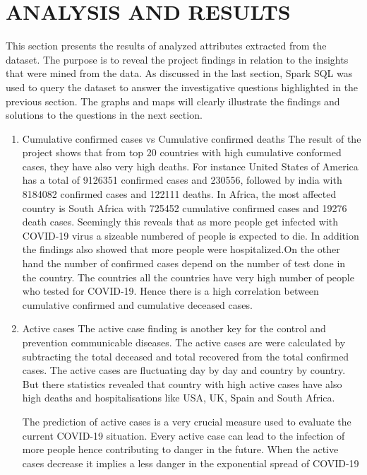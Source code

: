 \documentclass[11pt]{article}
\begin{document}
\section{ANALYSIS AND RESULTS}

This section presents the results of analyzed attributes extracted from the dataset. The purpose is to reveal the project findings  in relation to the insights that were mined from the data. As discussed in the last section, Spark SQL was used to query the dataset to answer the  investigative questions highlighted in the previous section. The graphs and maps will clearly illustrate the findings and solutions to the  questions in the next section.  

\begin{enumerate}
    \item Cumulative confirmed cases vs Cumulative confirmed deaths 
    The result of the project shows that  from top 20 countries with high cumulative conformed cases, they have also very high deaths. For instance United States of America has a total of 9126351 confirmed cases and 230556, followed by india with 8184082 confirmed cases and 122111 deaths. In Africa, the most affected country is South Africa with 725452 cumulative confirmed cases and 19276 death cases. Seemingly this reveals that as more people get infected with COVID-19 virus a sizeable numbered of people is expected to die. In addition the findings also showed that more people were hospitalized.On the other hand the number of confirmed cases depend on the number of test done in the country. The countries all the countries have very high number of people who tested for COVID-19.  Hence there is a high correlation between cumulative confirmed and  cumulative deceased cases. 
    
    \item Active cases
    The active case finding is another key for the control and prevention communicable diseases. The active cases are were calculated by subtracting the total deceased and total recovered from the total confirmed cases. The active cases are fluctuating day by day and country by country.  But  there statistics revealed that country with high active cases have also high deaths and hospitalisations like USA, UK, Spain and South Africa.
    
    The prediction of active cases is a very crucial measure used to evaluate the current COVID-19 situation. Every active case can lead to the infection of more people hence contributing to danger in the future. When the active cases decrease it implies a less danger in the  exponential spread of COVID-19
    

\end{enumerate}
\end{document}

